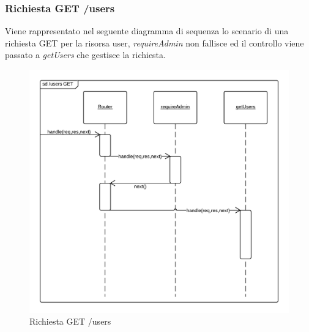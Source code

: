 \subsubsection{Richiesta GET /users}
Viene rappresentato nel seguente diagramma di sequenza lo scenario di una richiesta GET per la risorsa user, \emph{requireAdmin} non fallisce ed il controllo viene passato a \emph{getUsers} che gestisce la richiesta.
\begin{figure}[H]
	\begin{center} 
		\includegraphics[scale=0.20]{scenari/Users GET.png} 
		\caption{Richiesta GET /users}
	\end{center} 
\end{figure}

\pagebreak
